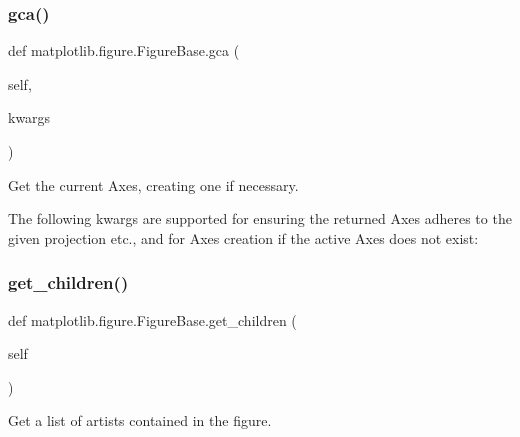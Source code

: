 \begin{DoxyVerb}
\subsubsection{\texorpdfstring{gca()}{gca()}}
{\footnotesize\ttfamily def matplotlib.\+figure.\+Figure\+Base.\+gca (\begin{DoxyParamCaption}\item[{}]{self,  }\item[{}]{kwargs }\end{DoxyParamCaption})}

\begin{DoxyVerb}Get the current Axes, creating one if necessary.

The following kwargs are supported for ensuring the returned Axes
adheres to the given projection etc., and for Axes creation if
the active Axes does not exist:

 \mbox{\label{classmatplotlib_1_1figure_1_1FigureBase_a199c4bf83686cbdca66073296b3b6541}} 
\subsubsection{\texorpdfstring{get\+\_\+children()}{get\_children()}}
{\footnotesize\ttfamily def matplotlib.\+figure.\+Figure\+Base.\+get\+\_\+children (\begin{DoxyParamCaption}\item[{}]{self }\end{DoxyParamCaption})}

\begin{DoxyVerb}Get a list of artists contained in the figure.\end{DoxyVerb}
 \mbox{\label{classmatplotlib_1_1figure_1_1FigureBase_a48513f9b12cb26d3953a44a1f08a75ae}} 

\end{DoxyVerb}
\end{DoxyVerb}
